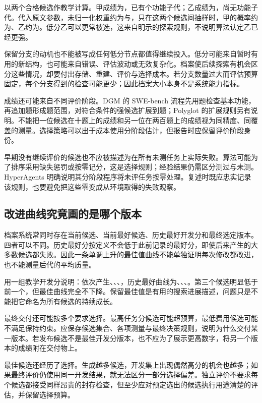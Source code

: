 以两个合格候选作教学计算。甲成绩为，已有个功能子代；乙成绩为，尚无功能子代。代入原文参数，未归一化权重约为与，只在这两个候选间抽样时，甲的概率约为、乙约为。低分乙可以更常被选，这来自明示的探索规则，不说明算法认定乙已经更强。

保留分支的动机也不能被写成任何低分节点都值得继续投入。低分可能来自暂时有用的新结构，也可能来自错误、评估波动或无效复杂化。档案使后续探索有机会区分这些情况，却要付出存储、重建、评价与选择成本。若分支数量过大而评估预算固定，每个分支得到的检查可能更少；因此档案大小本身不是系统能力指标。

成绩还可能来自不同评价阶段。DGM 的 SWE-bench 流程先用题检查基本功能，再追加题形成题范围，对符合条件的强候选扩展到题；Polyglot 的扩展规则另有说明\cite{dgm-2505}。不能把一位候选在十题上的成绩和另一位在两百题上的成绩视为同精度、同覆盖的测量。选择策略可以出于成本使用分阶段估计，但报告时应保留评价阶段身份。

早期没有继续评价的候选也不应被描述为在所有未测任务上实际失败。算法可能为了排序采用缺失惩罚或按零记分，这是选择规则；经验结果仍需区分测过与未测。HyperAgents 明确说明其分阶段程序将未评任务按零处理\cite{hyperagents-2603}。复述时既应忠实记录该规则，也要避免把这些零变成从环境取得的失败观察。

\subsection{改进曲线究竟画的是哪个版本}
\label{sec:ch12-bestcurve}

档案系统常同时存在当前候选、当前最好候选、历史最好开发分和最终选定版本。四者可以不同。历史最好分按定义不会低于此前记录的最好分，即使后来产生的大多数候选都失败。因此一条单调上升的最佳值曲线不能单独证明每次修改都改进，也不能测量后代的平均质量。

用一组教学开发分说明：依次产生、、、，历史最好曲线为、、、。第三个候选明显低于前一个，但最佳曲线完全不下降。保留最佳值是有用的搜索进展描述，问题只是不能把它命名为所有候选的持续成长。

最终交付还可能按多个要求选择。最高任务分候选可能超预算，最低费用候选可能不满足保持约束。应保存候选集合、各项测量与最终决策规则，说明为什么交付某一版本。若发布候选不是最佳开发分版本，也不应为了展示更高数字，将另一个版本的成绩附在交付物上。

最佳候选还经历了选择。生成越多候选，开发集上出现偶然高分的机会也越多；如果最终评价仍使用同一开发结果，就无法区分一部分选择偏差。独立评价不要求每个候选都接受同样昂贵的封存检查，但至少应对预定选出的候选执行用途清楚的评估，并保留选择预算。

